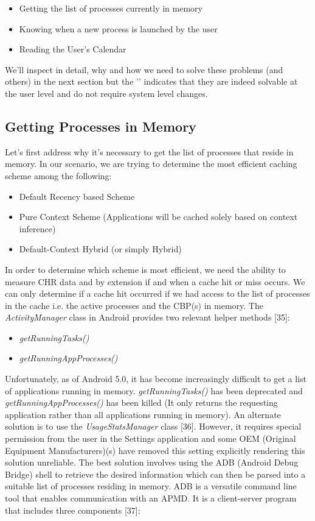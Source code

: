 \documentclass[12pt]{uthesis-v12}  %
\begin{document}
			\begin{itemize}
				\item Getting the list of processes currently in memory \checkmark
				\item Knowing when a new process is launched by the user \checkmark
				\item Reading the User's Calendar \checkmark
			\end{itemize} 
			
			We'll inspect in detail, why and how we need to solve these problems (and others) in the next section but the  '\checkmark' indicates that they are indeed solvable at the user level and do not require system level changes.
			
		\subsection{Getting Processes in Memory}
			Let's first address why it's necessary to get the list of processes that reside in memory. In our scenario, we are trying to determine the most efficient caching scheme among the following:
			
			\begin{itemize}
				\item Default Recency based Scheme
				\item Pure Context Scheme (Applications will be cached solely based on context inference)
				\item Default-Context Hybrid (or simply Hybrid)
			\end{itemize}
			
			In order to determine which scheme is most efficient, we need the ability to measure CHR data and by extension if and when a cache hit or miss occurs. We can only determine if a cache hit occurred if we had access to the list of processes in the cache i.e. the active processes and the CBP(s) in memory. The {\em ActivityManager} class in Android provides two relevant helper methods [35]:
			
			\begin{itemize}
				\item {\em getRunningTasks()}
				\item {\em getRunningAppProcesses()}
			\end{itemize} 
			
			Unfortunately, as of Android 5.0, it has become increasingly difficult to get a list of applications running in memory. {\em getRunningTasks()} has been deprecated and {\em getRunningAppProcesses()} has been killed (It only returns the requesting application rather than all applications running in memory). An alternate solution is to use the {\em UsageStatsManager} class [36]. However, it requires special permission from the user in the Settings application and some OEM (Original Equipment Manufacturers)(s) have removed this setting explicitly rendering this solution unreliable. The best solution involves using the ADB (Android Debug Bridge) shell to retrieve the desired information which can then be parsed into a suitable list of processes residing in memory. ADB is a versatile command line tool that enables communication with an APMD. It is a client-server program that includes three components [37]:
			
\end{document}

